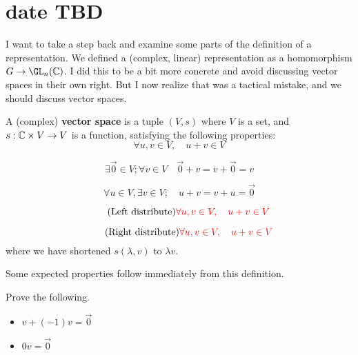 \section*{date TBD}


I want to take a step back and examine some parts of the definition of a representation.
We defined a (complex, linear) representation as a homomorphism $G\to \GL_n(\C)$.
I did this to be a bit more concrete and avoid discussing vector spaces in their own right.
But I now realize that was a tactical mistake, and we should discuss vector spaces.

\begin{definition}
    A (complex) {\bf vector space} is a tuple $(V, s)$ where $V$ is a set, 
    and $s:\mathbb{C} \times V \to V$ is a function,
    satisfying the following properties:
    \begin{equation*}\tag{Addition}
        \forall u,v\in V, \quad u+v\in V
    \end{equation*}

    \begin{equation*}\tag{Zero}
        \exists \vec{0}\in V; \forall v\in V \quad \vec{0}+v = v+\vec{0} = v
    \end{equation*}

    \begin{equation*}\tag{Negative}
        \forall u\in V, \exists v\in V; \quad u+v = v+u = \vec{0}
    \end{equation*}

    \begin{equation*}\tag{Left distribute}
        {\color{red}{ \forall u,v\in V, \quad u+v\in V }}
    \end{equation*}

    \begin{equation*}\tag{Right distribute}
        {\color{red}{ \forall u,v\in V, \quad u+v\in V }}
    \end{equation*}
    where we have shortened $s(\lambda,v)$ to $\lambda v$.
\end{definition}

Some expected properties follow immediately from this definition.

\begin{exercise}
    Prove the following.
    \begin{itemize}
        \item $v + (-1)v = \vec{0}$
        \item $0 v=\vec{0}$
    \end{itemize}
\end{exercise}

